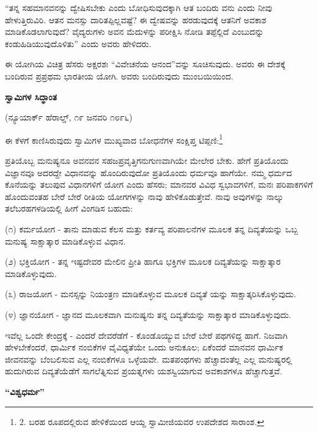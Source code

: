“ತನ್ನ ಸಹಮಾನವನನ್ನು ದ್ವೇಷಿಸಬೇಕು ಎಂದು ಬೋಧಿಸುವುದಕ್ಕಾಗಿ ಆತ ಬಂದಿರು ವನು ಎಂದು ನೀವು ಹೇಳುತ್ತಿರುವಿರಿ. ಆತನ ಮನಸ್ಸು ದಾರಿತಪ್ಪಿಲ್ಲವಷ್ಟೆ? ಈ ದ್ವೇಷವನ್ನು ಹರಡುವುದಕ್ಕೆ ಆತನಿಗೆ ಅವಕಾಶ ಮಾಡಿಕೊಡಲಾಗುವುದೆ? ವೈದ್ಯರುಗಳು ಅವನ ಮೆದುಳನ್ನು ಪರೀಕ್ಷಿಸಿ ನೋಡಿ ತಪ್ಪೆಲ್ಲಿದೆ ಎಂಬುದನ್ನು ಕಂಡುಹಿಡಿಯುವುದೊಳಿತು” ಎಂದು ಅವರು ಹೇಳಿದರು.

ಈ ಯೋಗಿಯ ವಿಚಿತ್ರ ಹೆಸರು ಅಕ್ಷರಶಃ “ವಿವೇಚನೆಯ ಆನಂದ”ವನ್ನು ಸೂಚಿಸುವುದು. ಅವರು ಈ ದೇಶಕ್ಕೆ ಬಂದಿರುವ ಪ್ರಪ್ರಥಮ ಭಾರತೀಯ ಯೋಗಿ. ಅವರು ಬಂದಿರುವುದು ಮುಂಬಯಿಯಿಂದ.

\begin{center}
\textbf{ಸ್ವಾಮಿಗಳ ಸಿದ್ಧಾಂತ}
\end{center}

\begin{center}
(ನ್ಯೂಯಾರ್ಕ್ ಹೆರಾಲ್ಡ್, ೧೯ ಜನವರಿ ೧೮೯೬)
\end{center}

ಈ ಕೆಳಗೆ ಕಾಣಿಸಿರುವುದು ಸ್ವಾಮಿಗಳ ಮುಖ್ಯವಾದ ಬೋಧನೆಗಳ ಸಂಕ್ಷಿಪ್ತ ಟಿಪ್ಪಣಿ:\footnote{2. ಬರಹ ರೂಪದಲ್ಲಿರುವ ಹೇಳಿಕೆಯಿಂದ ಆಯ್ದ ಸ್ವಾಮೀಜಿಯವರ ಉಪದೇಶದ ಸಾರಾಂಶ.}

ಪ್ರತಿಯೊಬ್ಬ ಮನುಷ್ಯನೂ ಅವನವನ ಸಹಜಪ್ರವೃತ್ತಿಗನುಗುಣವಾಗಿಯೇ ಮೇಲೇರ ಬೇಕು. ಹೇಗೆ ಪ್ರತಿಯೊಂದು ವಿಜ್ಞಾನವೂ ಅದರದ್ದೇ ವಿಧಾನವನ್ನು ಹೊಂದಿರುವುದೋ ಪ್ರತಿಯೊಂದು ಧರ್ಮವೂ ಹಾಗೆಯೇ. ನಮ್ಮ ಧರ್ಮದ ಕೊನೆಯನ್ನು ತಲುಪುವ ವಿಧಾನಗಳಿಗೆ ಯೋಗ ಎಂದು ಹೆಸರು; ಮಾನವರ ವಿವಿಧ ಸ್ವಭಾವಗಳಿಗೆ, ಮನಃ ಪರಿಪಾಕಗಳಿಗೆ ಹೊಂದುವಂತಹ ಬೇರೆ ಬೇರೆ ರೀತಿಯ ಯೋಗಗಳನ್ನು ನಾವು ಹೇಳಿಕೊಡುತ್ತೇವೆ. ನಾವು ಅವುಗಳನ್ನು ನಾಲ್ಕು ತಲೆಬರಹಗಳಡಿಯಲ್ಲಿ ಹೀಗೆ ವಿಂಗಡಿಸ ಬಹುದು:

(೧) ಕರ್ಮಯೋಗ - ತಾನು ಮಾಡುವ ಕೆಲಸ ಮತ್ತು ಕರ್ತವ್ಯ ಪರಿಪಾಲನೆಗಳ ಮೂಲಕ ತನ್ನ ದಿವ್ಯತೆಯನ್ನು ಒಬ್ಬ ಮನುಷ್ಯ ಸಾಕ್ಷಾತ್ಕಾರ ಮಾಡಿಕೊಳ್ಳುವ ವಿಧಾನ.

(೨) ಭಕ್ತಿಯೋಗ - ತನ್ನ ಇಷ್ಟದೇವರ ಮೇಲಿನ ಪ್ರೀತಿ ಹಾಗೂ ಭಕ್ತಿಗಳ ಮೂಲಕ ದಿವ್ಯತೆಯನ್ನು ಸಾಕ್ಷಾತ್ಕಾರ ಮಾಡಿಕೊಳ್ಳುವುದು.

(೩) ರಾಜಯೋಗ - ಮನಸ್ಸನ್ನು ನಿಯಂತ್ರಣ ಮಾಡಿಕೊಳ್ಳುವ ಮೂಲಕ ದಿವ್ಯತೆ ಯನ್ನು ಸಾಕ್ಷಾತ್ಕರಿಸಿಕೊಳ್ಳುವುದು.

(೪) ಜ್ಞಾನಯೋಗ - ಜ್ಞಾನದ ಮೂಲಕವಾಗಿ ಮನುಷ್ಯನು ತನ್ನ ದಿವ್ಯತೆಯನ್ನು ಸಾಕ್ಷಾತ್ಕಾರ ಮಾಡಿಕೊಳ್ಳುವುದು.

ಇವೆಲ್ಲ ಒಂದೇ ಕೇಂದ್ರಕ್ಕೆ - ಎಂದರೆ ದೇವರೆಡೆಗೆ - ಕೊಂಡೊಯ್ಯುವ ಬೇರೆ ಬೇರೆ ಪಥಗಳಿದ್ದ ಹಾಗೆ. ನಿಜವಾಗಿ ಹೇಳಬೇಕೆಂದರೆ, ಧಾರ್ಮಿಕ ನಂಬಿಕೆಗಳ ವೈವಿಧ್ಯತೆಯೇ ಒಂದು ಅನುಕೂಲ; ಏಕೆಂದರೆ ಮಾನವನ ಧಾರ್ಮಿಕ ಜೀವನವನ್ನು ಬೆಂಬಲಿಸುವ ಎಲ್ಲ ನಂಬಿಕೆಗಳೂ ಒಳ್ಳೆಯವೇ. ಮತಪಂಥಗಳು ಹೆಚ್ಚಾದಂತೆಲ್ಲ ಎಲ್ಲ ಮನುಷ್ಯರಲ್ಲಿ ಹುದುಗಿರುವ ದಿವ್ಯತೆಯೆಡೆಗೆ ಸಾಗಲೆತ್ನಿಸುವ ಪ್ರಯತ್ನಗಳು ಯಶಸ್ವಿಯಾಗುವ ಅವಕಾಶಗಳೂ ಹೆಚ್ಚಾಗುತ್ತವೆ.

\begin{center}
\textbf{“ವಿಶ್ವಧರ್ಮ”}
\end{center}

